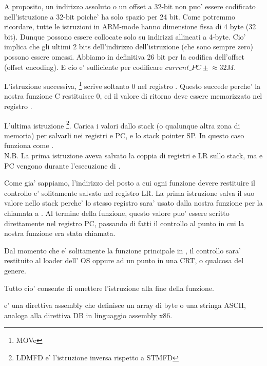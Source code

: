 A proposito, un indirizzo assoluto o un offset a 32-bit non puo' essere codificato nell'istruzione a 32-bit  poiche' ha solo spazio per 24 bit.
Come potremmo ricordare, tutte le istruzioni in ARM-mode hanno dimensione fissa di 4 byte (32 bit).
Dunque possono essere collocate solo su indirizzi allineati a 4-byte.
Cio' implica che gli ultimi 2 bits dell'indirizzo dell'istruzione (che sono sempre zero) possono essere omessi.
Abbiamo in definitiva 26 bit per la codifica dell'offset (offset encoding). E cio e' sufficiente per codificare $current\_PC \pm{} \approx{}32M$.

L'istruzione successiva, \footnote{\ITAph{} MOVe} scrive soltanto 0 nel registro .
Questo succede perche' la nostra funzione C restituisce 0, ed il valore di ritorno deve essere memorizzato nel registro .

L'ultima istruzione \footnote{\ac{LDMFD} e' l'istruzione inversa rispetto a  \ac{STMFD}}.
Carica i valori dallo stack (o qualunque altra zona di memoria) per salvarli nei registri  e \ac{PC}, e  lo \gls{stack pointer} \ac{SP}.
In questo caso funziona come \POP.\\
N.B. La prima istruzione  aveva salvato la coppia di registri  e \ac{LR} sullo stack, ma  e \ac{PC} vengono  durante l'esecuzione di .

Come gia' sappiamo, l'indirizzo del posto a cui ogni funzione devere restituire il controllo e' solitamente salvato nel registro \ac{LR}.
La prima istruzione salva il suo valore nello stack perche' lo stesso registro sara' usato dalla nostra funzione \main per la chiamata a \printf.
Al termine della funzione, questo valore puo' essere scritto direttamente nel registro \ac{PC}, passando di fatti il controllo al punto in cui la nostra funzione era stata chiamata.

Dal momento che \main e' solitamente la funzione principale in \CCpp,
il controllo sara' restituito al loader dell' \ac{OS} oppure ad un punto in una \ac{CRT},
o qualcosa del genere.

Tutto cio' consente di omettere l'istruzione  alla fine della funzione.

 e' una direttiva assembly che definisce un array di byte o una stringa ASCII, analoga alla direttiva DB in linguaggio assembly x86.

